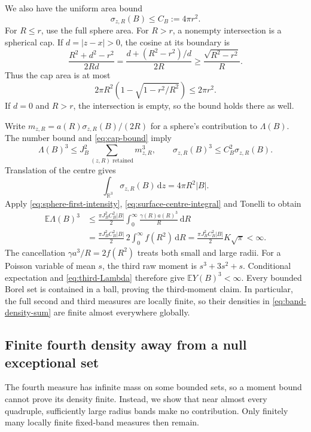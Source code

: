 \documentclass[11pt,a4paper]{article}
\numberwithin{equation}{section}
\theoremstyle{definition}
\theoremstyle{remark}
\newcommand{\R}{\mathbb R}
\newcommand{\E}{\mathbb E}
\newcommand{\dd}{\,\mathrm d}
\begin{document}
We also have the uniform area bound
\begin{equation}
 \sigma_{z,R}(B)\leq C_B:=4\pi r^2.
 \label{eq:cap-bound}
\end{equation}
For $R\leq r$, use the full sphere area. For $R>r$, a nonempty
intersection is a spherical cap. If $d=|z-x|>0$, the cosine at its boundary
is
\[
 \frac{R^2+d^2-r^2}{2Rd}
 =\frac{d+(R^2-r^2)/d}{2R}
 \geq\frac{\sqrt{R^2-r^2}}{R}.
\]
Thus the cap area is at most
\[
 2\pi R^2\left(1-\sqrt{1-r^2/R^2}\right)\leq2\pi r^2.
\]
If $d=0$ and $R>r$, the intersection is empty, so the bound holds there
as well.

Write $m_{z,R}=a(R)\sigma_{z,R}(B)/(2R)$ for a sphere's contribution to
$\Lambda(B)$. The number bound and \eqref{eq:cap-bound} imply
\[
 \Lambda(B)^3\leq J_B^2\sum_{(z,R)\text{ retained}}m_{z,R}^3,
 \qquad
 \sigma_{z,R}(B)^3\leq C_B^2\sigma_{z,R}(B).
\]
Translation of the centre gives
\begin{equation}
 \int_{\R^3}\sigma_{z,R}(B)\dd z=4\pi R^2|B|.
 \label{eq:surface-centre-integral}
\end{equation}
Apply \eqref{eq:sphere-first-intensity},
\eqref{eq:surface-centre-integral} and Tonelli to obtain
\begin{align}
 \E\Lambda(B)^3
 &\leq\frac{\pi J_B^2C_B^2|B|}{2}
             \int_0^\infty\frac{\gamma(R)a(R)^3}{R}\dd R\nonumber\\
 &=\frac{\pi J_B^2C_B^2|B|}{2}
             \,2\int_0^\infty f(R^2)\dd R
 =\frac{\pi J_B^2C_B^2|B|}{2}K\sqrt\pi<\infty.
 \label{eq:third-Lambda}
\end{align}
The cancellation $\gamma a^3/R=2f(R^2)$ treats both small and large
radii. For a Poisson variable of mean $s$, the third raw moment is
$s^3+3s^2+s$. Conditional expectation and
\eqref{eq:third-Lambda} therefore give $\E Y(B)^3<\infty$.
Every bounded Borel set is contained in a ball, proving the third-moment
claim. In particular, the full second and third measures are locally
finite, so their densities in \eqref{eq:band-density-sum} are finite
almost everywhere globally.

\subsection{Finite fourth density away from a null exceptional set}
\label{app:radius-bound}

The fourth measure has infinite mass on some bounded sets, so a moment
bound cannot prove its density finite. Instead, we show that near almost
every quadruple, sufficiently large radius bands make no contribution.
Only finitely many locally finite fixed-band measures then remain.
\end{document}
